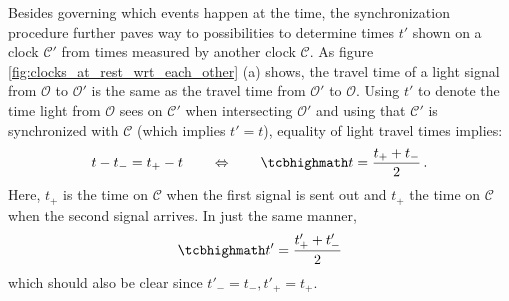 Besides governing which events happen at the time, the synchronization procedure further paves way to possibilities to determine times $t'$ shown on a clock $\mathcal{C}'$ from times measured by another clock $\mathcal{C}$. As figure \ref{fig:clocks_at_rest_wrt_each_other} (a) shows, the travel time of a light signal from $\mathcal{O}$ to $\mathcal{O}'$ is the same as the travel time from $\mathcal{O}'$ to $\mathcal{O}$. Using $t'$ to denote the time light from $\mathcal{O}$ sees on $\mathcal{C}'$ when intersecting $\mathcal{O}'$ and using that $\mathcal{C}'$ is synchronized with $\mathcal{C}$ (which implies $t' = t$), equality of light travel times implies:
\begin{equation}\label{eq:time_synchr}
t - t_- = t_+ - t
\qquad \Leftrightarrow \qquad
\eqbox{
t = \frac{t_+ + t_-}{2}
} \, .
\end{equation}
Here, $t_+$ is the time on $\mathcal{C}$ when the first signal is sent out and $t_+$ the time on $\mathcal{C}$ when the second signal arrives. In just the same manner,
\begin{equation}\label{eq:time_synchr_primed}
\eqbox{
t' = \frac{t'_+ + t'_-}{2}
}
\end{equation}
which should also be clear since $t'_- = t_-, t'_+ = t_+$.\\



